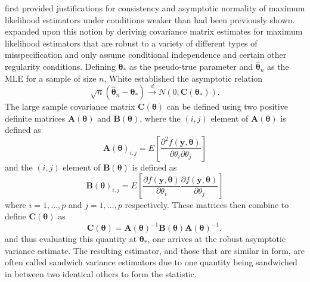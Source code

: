 \documentclass[sn-mathphys-ay]{sn-jnl}
\begin{document}
\citet{Huber} first provided justifications for consistency and asymptotic normality of maximum likelihood estimators under conditions weaker than had been previously shown. \citet{White1982}
expanded upon this notion by deriving covariance matrix estimates for maximum likelihood estimators that are robust to a variety of different types of misspecification and only assume
conditional independence and certain other regularity conditions. Defining $\bm{\theta}_*$ as the pseudo-true parameter and $\hat{\bm{\theta}}_n$ as the MLE for a sample of size
$n$, White established the asymptotic relation
\begin{equation*}
	\sqrt{n} (\hat{\bm{\theta}}_n - \bm{\theta}_*) \xrightarrow[]{d} N(0, \bm{C}(\bm{\theta}_* ) ) .
\end{equation*}
The large sample covariance matrix $\bm{C}(\bm{\theta})$ can be defined using two positive definite matrices $\bm{A}(\bm{\theta})$ and $\bm{B}(\bm{\theta})$, where the $(i,j)$ element of $\bm{A}(\bm{\theta})$ is defined as
\begin{equation*}
	\bm{A}(\bm{\theta})_{i,j} = E \left[ \frac{\partial^2 f(\bm{y},\bm{\theta})}{\partial \theta_i \partial \theta_j} \right] 
\end{equation*}
and the $(i,j)$ element of $\bm{B}(\bm{\theta})$ is defined as
\begin{equation*}
	\bm{B}(\bm{\theta})_{i,j} = E \left[ \frac{\partial f(\bm{y},\bm{\theta})}{\partial \theta_i} \frac{\partial f(\bm{y},\bm{\theta})}{\partial \theta_j} \right] 
\end{equation*}
where $i = 1,...,p$ and $j = 1,...,p$ respectively. These matrices then combine to define $\bm{C}(\bm{\theta})$ as
\begin{equation*}
	\bm{C}(\bm{\theta}) = \bm{A}(\bm{\theta})^{-1} \bm{B}(\bm{\theta}) \bm{A}(\bm{\theta})^{-1} ,
\end{equation*}
and thus evaluating this quantity at $\bm{\theta}_*$, one arrives at the robust asymptotic variance estimate. The resulting estimator, and those that are similar in form, are often called sandwich
variance estimators due to one quantity being sandwiched in between two identical others to form the statistic.
\end{document}
